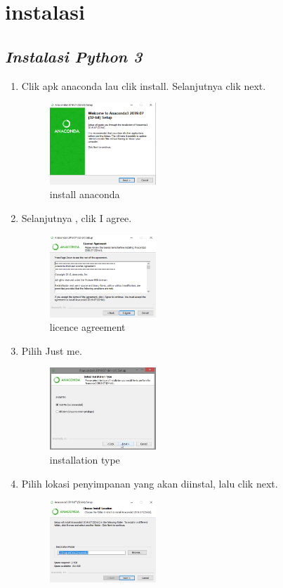 \chapter*{instalasi}


\section*{\textit{ Instalasi Python 3}}
\begin{enumerate}
		\item Clik apk anaconda lau clik install. Selanjutnya clik next.
		\begin{figure}[h]
			\includegraphics[width=4cm]{figure/1.png}
			\centering
			\caption{install anaconda}
			\end{figure}
		\item Selanjutnya , clik I agree.
			\begin{figure}[h]
			\includegraphics[width=4cm]{figure/2.png}
			\centering
			\caption{licence agreement}
			\end{figure}
		\item Pilih Just me.
			\begin{figure}[h]
			\includegraphics[width=4cm]{figure/3.png}
			\centering
			\caption{installation type}
			\end{figure}
		\item Pilih lokasi penyimpanan yang akan diinstal, lalu clik next.
			\begin{figure}[h]
			\includegraphics[width=4cm]{figure/4.png}

\end{figure}
\end{enumerate}
